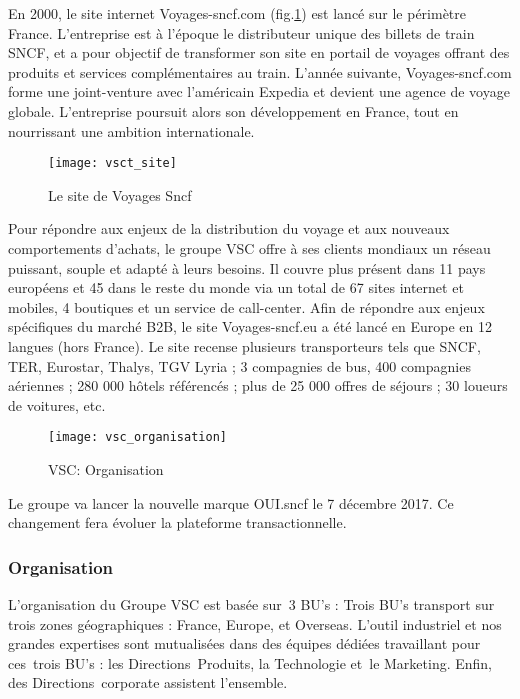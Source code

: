 En 2000, le site internet Voyages-sncf.com (fig.\ref{fig:vsct_site}) est lancé sur le périmètre France. L’entreprise est à l’époque le distributeur unique des billets de train SNCF, et a pour objectif de transformer son site en portail de voyages offrant des produits et services complémentaires au train. L’année suivante, Voyages-sncf.com forme une joint-venture avec l’américain Expedia et devient une agence de voyage globale. L’entreprise poursuit alors son développement en France, tout en nourrissant une ambition internationale.

\begin{figure}[ht]
 \centering
 \texttt{[image: vsct\_site]}
 \caption{Le site de Voyages Sncf}
 \label{fig:vsct_site}
\end{figure}

Pour répondre aux enjeux de la distribution du voyage et aux nouveaux comportements d’achats, le groupe VSC offre à ses clients mondiaux un réseau puissant, souple et adapté à leurs besoins. Il couvre plus présent dans 11 pays européens et 45 dans le reste du monde via un total de 67 sites internet et mobiles, 4 boutiques et un service de call-center. Afin de répondre aux enjeux spécifiques du marché B2B, le site Voyages-sncf.eu a été lancé en Europe en 12 langues (hors France).
Le site recense plusieurs transporteurs tels que SNCF, TER, Eurostar, Thalys, TGV Lyria ; 3 compagnies de bus, 400 compagnies aériennes ; 280 000 hôtels référencés ; plus de 25 000 offres de séjours ; 30 loueurs de voitures, etc.

\begin{figure}[ht]
 \centering
 \texttt{[image: vsc\_organisation]}
 \caption{VSC: Organisation}
\end{figure}

Le groupe va lancer la nouvelle marque OUI.sncf le 7 décembre 2017.
Ce changement fera évoluer la plateforme transactionnelle.

\subsubsection{Organisation}
L'organisation du Groupe VSC est basée sur 3 BU’s :
Trois BU’s transport sur trois zones géographiques : France, Europe, et Overseas.
L’outil industriel et nos grandes expertises sont mutualisées dans des équipes dédiées travaillant pour ces trois BU’s : les Directions Produits, la Technologie et le Marketing. Enfin, des Directions corporate assistent l'ensemble.

